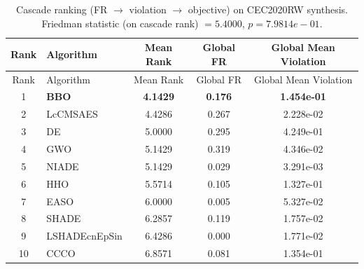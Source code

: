 \begin{center}
\small
\renewcommand{\arraystretch}{1.25}
\begin{longtable}{clccc}
\caption{Cascade ranking (FR $\to$ violation $\to$ objective) on CEC2020RW  synthesis. Friedman statistic (on cascade rank) $=5.4000$, $p=7.9814e-01$.}
\label{tab:cascade_ranking_CEC2020RW_synthesis} \\
\toprule
Rank & Algorithm & Mean Rank & Global FR & Global Mean Violation \\
\midrule
\endfirsthead
\toprule
Rank & Algorithm & Mean Rank & Global FR & Global Mean Violation \\
\midrule
\endhead
1 & \textbf{BBO} & \textbf{4.1429} & \textbf{0.176} & \textbf{1.454e-01} \\
2 & LcCMSAES & 4.4286 & 0.267 & 2.228e-02 \\
3 & DE & 5.0000 & 0.295 & 4.249e-01 \\
4 & GWO & 5.1429 & 0.319 & 4.346e-02 \\
5 & NIADE & 5.1429 & 0.029 & 3.291e-03 \\
6 & HHO & 5.5714 & 0.105 & 1.327e-01 \\
7 & EASO & 6.0000 & 0.005 & 5.327e-02 \\
8 & SHADE & 6.2857 & 0.119 & 1.757e-02 \\
9 & LSHADEcnEpSin & 6.4286 & 0.000 & 1.771e-02 \\
10 & CCCO & 6.8571 & 0.081 & 1.354e-01 \\
\bottomrule
\end{longtable}
\end{center}